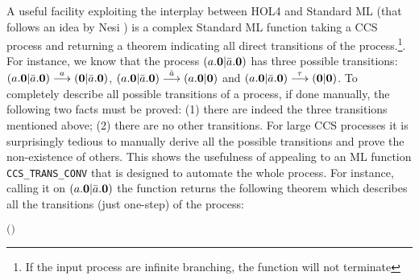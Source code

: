 A useful facility exploiting the interplay
between HOL4 and Standard ML (that follows an idea by Nesi \cite{Nesi:1992ve})
 is a complex Standard ML function
  taking a CCS process and returning a theorem indicating all
  direct transitions of the process.\footnote{If the input process are
 infinite branching, the function will not terminate}.
For instance, we know that the process $(a.{\boldsymbol 0} | \bar{a}.{\boldsymbol 0})$ has three
possible transitions: $(a.{\boldsymbol 0} | \bar{a}.{\boldsymbol 0}) \overset{a}{\longrightarrow}
({\boldsymbol 0} | \bar{a}.{\boldsymbol 0})$, $(a.{\boldsymbol 0} | \bar{a}.{\boldsymbol 0})
\overset{\bar{a}}{\longrightarrow} (a.{\boldsymbol 0} | {\boldsymbol 0})$ and $(a.{\boldsymbol 0} | \bar{a}.{\boldsymbol 0})
\overset{\tau}{\longrightarrow} ({\boldsymbol 0} | {\boldsymbol 0})$.
To completely describe all possible transitions of a process, if done manually, the
following two facts must be proved: (1) there are indeed the three
  transitions mentioned above; (2) there are no other
  transitions. For large CCS processes it is surprisingly tedious to manually derive
all the possible transitions and prove the non-existence of others.
This shows the usefulness of appealing to an ML function
\texttt{CCS\_TRANS\_CONV} that is designed to automate the whole process.
For instance, calling it on $(a.{\boldsymbol 0} | \bar{a}.{\boldsymbol 0})$ the function returns the
following theorem which describes all the transitions (just one-step) of the process:
\begin{alltt}
\HOLTokenTurnstile{} \HOLConst{\HOLTokenInputAct} \HOLSymConst{\ensuremath{\ldotp}} \HOLSymConst{\ensuremath{\mid}} \HOLConst{\HOLTokenOutputAct} \HOLSymConst{\ensuremath{\ldotp}} \HOLTokenTransBegin{}\HOLTokenTransEnd {} \HOLSymConst{\HOLTokenEquiv{}}
   \ensuremath{(} \HOLSymConst{\ensuremath{=}} \HOLConst{\HOLTokenInputAct}  \HOLSymConst{\HOLTokenConj{}}  \HOLSymConst{\ensuremath{=}}  \HOLSymConst{\ensuremath{\mid}} \HOLConst{\HOLTokenOutputAct} \HOLSymConst{\ensuremath{\ldotp}} \HOLSymConst{\HOLTokenDisj{}}  \HOLSymConst{\ensuremath{=}} \HOLConst{\HOLTokenOutputAct}  \HOLSymConst{\HOLTokenConj{}}  \HOLSymConst{\ensuremath{=}} \HOLConst{\HOLTokenInputAct} \HOLSymConst{\ensuremath{\ldotp}} \HOLSymConst{\ensuremath{\mid}} \ensuremath{)} \HOLSymConst{\HOLTokenDisj{}}
    \HOLSymConst{\ensuremath{=}} \HOLSymConst{\ensuremath{\tau}} \HOLSymConst{\HOLTokenConj{}}  \HOLSymConst{\ensuremath{=}}  \HOLSymConst{\ensuremath{\mid}} 
\end{alltt}

